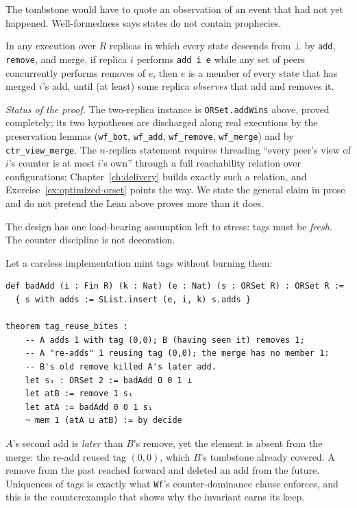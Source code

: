 \documentclass[12pt, a4paper, openright]{book}
\theoremstyle{thmstyle}
\theoremstyle{defstyle}
\newcommand{\lc}[1]{\texttt{#1}}
\newenvironment{thmbox}[1][]{%
  \begin{tcolorbox}[thmbox, title={\ifx\\#1\\Theorem\else#1\fi}]%
}{\end{tcolorbox}}
\newcounter{refutation}[chapter]
\renewcommand{\therefutation}{\thechapter.\arabic{refutation}}
\newenvironment{refutedbox}[1]{%
  \refstepcounter{refutation}%
  \begin{tcolorbox}[refutedbox,
    title={Refuted \therefutation\ --- #1}]%
}{\end{tcolorbox}}
\begin{document}
The tombstone would have to quote an observation of an event that had
not yet happened. Well-formedness says states do not contain prophecies.

\begin{thmbox}[Add-wins, general form]
  In any execution over $R$ replicas in which every state descends from
  $\bot$ by \lc{add}, \lc{remove}, and merge, if replica $i$ performs
  \lc{add i e} while any set of peers concurrently performs removes of
  $e$, then $e$ is a member of every state that has merged $i$'s add,
  until (at least) some replica \emph{observes} that add and removes it.

  \emph{Status of the proof.} The two-replica instance is
  \lc{ORSet.addWins} above, proved completely; its two hypotheses are
  discharged along real executions by the preservation lemmas
  (\lc{wf_bot}, \lc{wf_add}, \lc{wf_remove}, \lc{wf_merge}) and by
  \lc{ctr_view_merge}. The $n$-replica statement requires threading
  ``every peer's view of $i$'s counter is at most $i$'s own'' through a
  full reachability relation over configurations; Chapter~\ref{ch:delivery}
  builds exactly such a relation, and Exercise~\ref{ex:optimized-orset}
  points the way. We state the general claim in prose and do not
  pretend the Lean above proves more than it does.
\end{thmbox}

The design has one load-bearing assumption left to stress: tags must be
\emph{fresh}. The counter discipline is not decoration.

\begin{refutedbox}{Tags can be reused}
\label{ref:tag-reuse}
  Let a careless implementation mint tags without burning them:
\begin{verbatim}
def badAdd (i : Fin R) (k : Nat) (e : Nat) (s : ORSet R) : ORSet R :=
  { s with adds := SList.insert (e, i, k) s.adds }

theorem tag_reuse_bites :
    -- A adds 1 with tag (0,0); B (having seen it) removes 1;
    -- A "re-adds" 1 reusing tag (0,0); the merge has no member 1:
    -- B's old remove killed A's later add.
    let s₁ : ORSet 2 := badAdd 0 0 1 ⊥
    let atB := remove 1 s₁
    let atA := badAdd 0 0 1 s₁
    ¬ mem 1 (atA ⊔ atB) := by decide
\end{verbatim}
  $A$'s second add is \emph{later} than $B$'s remove, yet the element
  is absent from the merge: the re-add reused tag $(0,0)$, which $B$'s
  tombstone already covered. A remove from the past reached forward and
  deleted an add from the future. Uniqueness of tags is exactly what
  \lc{Wf}'s counter-dominance clause enforces, and this is the
  counterexample that shows why the invariant earns its keep.
\end{refutedbox}
\end{document}
